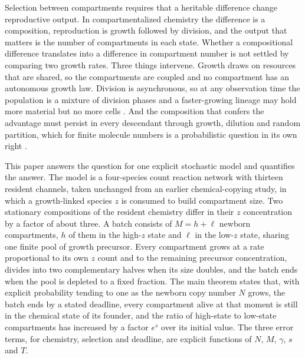 \documentclass[11pt,a4paper]{article}
\theoremstyle{plain}
\theoremstyle{definition}
\theoremstyle{remark}
\begin{document}
Selection between compartments requires that a heritable difference change reproductive output. In compartmentalized chemistry the difference is a composition, reproduction is growth followed by division, and the output that matters is the number of compartments in each state. Whether a compositional difference translates into a difference in compartment number is not settled by comparing two growth rates. Three things intervene. Growth draws on resources that are shared, so the compartments are coupled and no compartment has an autonomous growth law. Division is asynchronous, so at any observation time the population is a mixture of division phases and a faster-growing lineage may hold more material but no more cells \citep{powell1956,taheri2015}. And the composition that confers the advantage must persist in every descendant through growth, dilution and random partition, which for finite molecule numbers is a probabilistic question in its own right \citep{segre2000,vasas2010,virgo2015}.

This paper answers the question for one explicit stochastic model and quantifies the answer. The model is a four-species count reaction network with thirteen resident channels, taken unchanged from an earlier chemical-copying study, in which a growth-linked species $z$ is consumed to build compartment size. Two stationary compositions of the resident chemistry differ in their $z$ concentration by a factor of about three. A batch consists of $M=h+\ell$ newborn compartments, $h$ of them in the high-$z$ state and $\ell$ in the low-$z$ state, sharing one finite pool of growth precursor. Every compartment grows at a rate proportional to its own $z$ count and to the remaining precursor concentration, divides into two complementary halves when its size doubles, and the batch ends when the pool is depleted to a fixed fraction. The main theorem states that, with explicit probability tending to one as the newborn copy number $N$ grows, the batch ends by a stated deadline, every compartment alive at that moment is still in the chemical state of its founder, and the ratio of high-state to low-state compartments has increased by a factor $e^{s}$ over its initial value. The three error terms, for chemistry, selection and deadline, are explicit functions of $N$, $M$, $\gamma$, $s$ and $T$.
\end{document}
